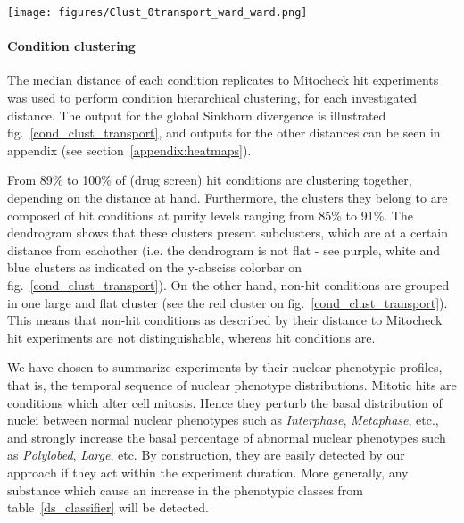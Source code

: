 \begin{figure*}[ht!]
\centerline{\texttt{[image: figures/Clust\_0transport\_ward\_ward.png]}}

\caption{Drug screen condition - Mitocheck siRNA two-dimensional hierarchical clustering using global Sinkhorn divergence. Ward method was used in combination with the Euclidean distance.}
\label{cond_clust_transport}
\end{figure*}

\paragraph{Condition clustering}
The median distance of each condition replicates to Mitocheck hit experiments was used to perform condition hierarchical clustering, for each investigated distance. The output for the global Sinkhorn divergence is illustrated fig.~\ref{cond_clust_transport}, and outputs for the other distances can be seen in appendix (see section~\ref{appendix:heatmaps}).

From 89\% to 100\% of (drug screen) hit conditions are clustering together, depending on the distance at hand. Furthermore, the clusters they belong to are composed of hit conditions at purity levels ranging from 85\% to 91\%. The dendrogram shows that these clusters present subclusters, which are at a certain distance from eachother (i.e. the dendrogram is not flat - see purple, white and blue clusters as indicated on the y-absciss colorbar on fig.~\ref{cond_clust_transport}). On the other hand, non-hit conditions are grouped in one large and flat cluster (see the red cluster on fig.~\ref{cond_clust_transport}). This means that non-hit conditions as described by their distance to Mitocheck hit experiments are not distinguishable, whereas hit conditions are.

We have chosen to summarize experiments by their nuclear phenotypic profiles, that is, the temporal sequence of nuclear phenotype distributions. Mitotic hits are conditions which alter cell mitosis. Hence they perturb the basal distribution of nuclei between normal nuclear phenotypes such as \textit{Interphase}, \textit{Metaphase}, etc., and strongly increase the basal percentage of abnormal nuclear phenotypes such as \textit{Polylobed}, \textit{Large}, etc. By construction, they are easily detected by our approach if they act within the experiment duration. More generally, any substance which cause an increase in the phenotypic classes from table~\ref{ds_classifier} will be detected.

